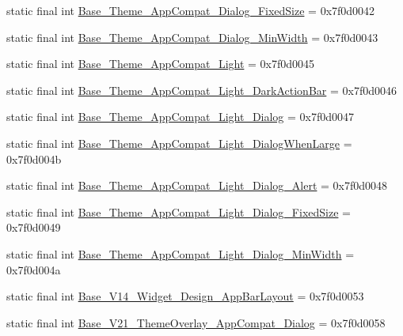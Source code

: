 \begin{DoxyCompactItemize}
\item 
static final int \mbox{\hyperlink{classandroid_1_1support_1_1design_1_1_r_1_1style_abb3e972d5a6c0584b50249b06d8480be}{Base\+\_\+\+Theme\+\_\+\+App\+Compat\+\_\+\+Dialog\+\_\+\+Fixed\+Size}} = 0x7f0d0042
\item 
static final int \mbox{\hyperlink{classandroid_1_1support_1_1design_1_1_r_1_1style_aac1d079153dc508f7d8f6b0c2469e8a3}{Base\+\_\+\+Theme\+\_\+\+App\+Compat\+\_\+\+Dialog\+\_\+\+Min\+Width}} = 0x7f0d0043
\item 
static final int \mbox{\hyperlink{classandroid_1_1support_1_1design_1_1_r_1_1style_aec318d3a8e9ecefd9031f08ae588d966}{Base\+\_\+\+Theme\+\_\+\+App\+Compat\+\_\+\+Light}} = 0x7f0d0045
\item 
static final int \mbox{\hyperlink{classandroid_1_1support_1_1design_1_1_r_1_1style_a9ddf73b77f2f311699b8f3b865849ef2}{Base\+\_\+\+Theme\+\_\+\+App\+Compat\+\_\+\+Light\+\_\+\+Dark\+Action\+Bar}} = 0x7f0d0046
\item 
static final int \mbox{\hyperlink{classandroid_1_1support_1_1design_1_1_r_1_1style_af5d45129d3e4af93a8217238dfafaf78}{Base\+\_\+\+Theme\+\_\+\+App\+Compat\+\_\+\+Light\+\_\+\+Dialog}} = 0x7f0d0047
\item 
static final int \mbox{\hyperlink{classandroid_1_1support_1_1design_1_1_r_1_1style_a0ad4907d451d72d762746efffaf2eb0a}{Base\+\_\+\+Theme\+\_\+\+App\+Compat\+\_\+\+Light\+\_\+\+Dialog\+When\+Large}} = 0x7f0d004b
\item 
static final int \mbox{\hyperlink{classandroid_1_1support_1_1design_1_1_r_1_1style_ab4c97086018fdcb13c697486f0bc95d9}{Base\+\_\+\+Theme\+\_\+\+App\+Compat\+\_\+\+Light\+\_\+\+Dialog\+\_\+\+Alert}} = 0x7f0d0048
\item 
static final int \mbox{\hyperlink{classandroid_1_1support_1_1design_1_1_r_1_1style_a226a2a22f1ac3a745bc2564cd99de646}{Base\+\_\+\+Theme\+\_\+\+App\+Compat\+\_\+\+Light\+\_\+\+Dialog\+\_\+\+Fixed\+Size}} = 0x7f0d0049
\item 
static final int \mbox{\hyperlink{classandroid_1_1support_1_1design_1_1_r_1_1style_af0527dd1a67e7b9b0a12f3aee871151a}{Base\+\_\+\+Theme\+\_\+\+App\+Compat\+\_\+\+Light\+\_\+\+Dialog\+\_\+\+Min\+Width}} = 0x7f0d004a
\item 
static final int \mbox{\hyperlink{classandroid_1_1support_1_1design_1_1_r_1_1style_af87dcb855144d2286beeaf7ef423efab}{Base\+\_\+\+V14\+\_\+\+Widget\+\_\+\+Design\+\_\+\+App\+Bar\+Layout}} = 0x7f0d0053
\item 
static final int \mbox{\hyperlink{classandroid_1_1support_1_1design_1_1_r_1_1style_a6ec8c1bf9ab5458f83c6c2b2d1b7247e}{Base\+\_\+\+V21\+\_\+\+Theme\+Overlay\+\_\+\+App\+Compat\+\_\+\+Dialog}} = 0x7f0d0058

\end{DoxyCompactItemize}
